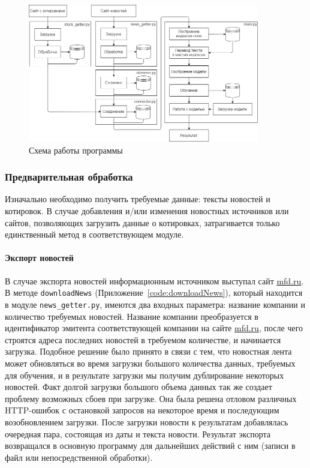 \documentclass[14pt]{matmex-diploma-custom}
\begin{document}
\begin{figure}[h]
\centering
\includegraphics[width=0.9\textwidth]{img/program}
\caption{Схема работы программы}
\label{img:program}
\end{figure}

\subsubsection{Предварительная обработка}

Изначально необходимо получить требуемые данные: тексты новостей и котировок. В случае добавления и/или изменения новостных источников или сайтов, позволяющих загрузить данные о котировках, затрагивается только единственный метод в соответствующем модуле.

\paragraph{Экспорт новостей}

В случае экспорта новостей информационным источником выступал сайт \url{mfd.ru}. В методе \texttt{downloadNews} (Приложение~\ref{code:downloadNews}), который находится в модуле \texttt{news\_getter.py}, имеются два входных параметра: название компании и количество требуемых новостей. Название компании преобразуется в идентификатор эмитента соответствующей компании на сайте \url{mfd.ru}, после чего строятся адреса последних новостей в требуемом количестве, и начинается загрузка. Подобное решение было принято в связи с тем, что новостная лента может обновляться во время загрузки большого количества данных, требуемых для обучения, и в результате загрузки мы получим дублирование некоторых новостей. Факт долгой загрузки большого объема данных так же создает проблему возможных сбоев при загрузке. Она была решена отловом различных HTTP-ошибок с остановкой запросов на некоторое время и последующим возобновлением загрузки. После загрузки новости к результатам добавлялась очередная пара, состоящая из даты и текста новости. Результат экспорта возвращался в основную программу для дальнейших действий с ним (записи в файл или непосредственной обработки).
\end{document}
